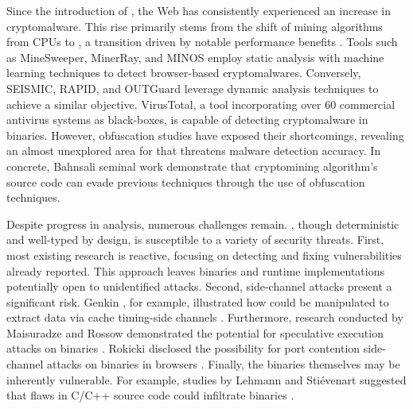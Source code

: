 Since the introduction of \Wasm, the Web has consistently experienced an increase in cryptomalware. 
This rise primarily stems from the shift of mining algorithms from CPUs to \Wasm, a transition driven by notable performance benefits \cite{musch2019new}.
Tools such as MineSweeper\cite{Minesweeper}, MinerRay\cite{MinerRay}, and MINOS\cite{MINOS} employ static analysis with machine learning techniques to detect browser-based cryptomalwares.
Conversely, SEISMIC\cite{SEISMIC}, RAPID\cite{RAPID}, and OUTGuard\cite{Outguard} leverage dynamic analysis techniques to achieve a similar objective.
VirusTotal, a tool incorporating over 60 commercial antivirus systems as black-boxes, is capable of detecting cryptomalware in \Wasm binaries.
However, obfuscation studies have exposed their shortcomings, revealing an almost unexplored area for \Wasm that threatens malware detection accuracy.
In concrete, Bahnsali \etal seminal work\cite{10.1145/3507657.3528560} demonstrate that cryptomining algorithm's source code can evade previous techniques through the use of obfuscation techniques.



\label{background:wasm:challenges} 
Despite progress in \Wasm analysis, numerous challenges remain. 
\Wasm, though deterministic and well-typed by design, is susceptible to a variety of security threats. 
First, most existing \Wasm research is reactive, focusing on detecting and fixing vulnerabilities already reported. 
This approach leaves \Wasm binaries and runtime implementations potentially open to unidentified attacks. 
Second, side-channel attacks present a significant risk. 
Genkin \etal, for example, illustrated how \Wasm could be manipulated to extract data via cache timing-side channels \cite{Genkin2018DrivebyKC}. 
Furthermore, research conducted by Maisuradze and Rossow demonstrated the potential for speculative execution attacks on \Wasm binaries \cite{ret2spec}. 
Rokicki \etal disclosed the possibility for port contention side-channel attacks on \Wasm binaries in browsers \cite{10.1145/3488932.3517411}. 
Finally, the binaries themselves may be inherently vulnerable. 
For example, studies by Lehmann \etal and Stiévenart \etal suggested that flaws in C/C++ source code could infiltrate \Wasm binaries \cite{usenixWasm2020, DeRoover2022}.
 
